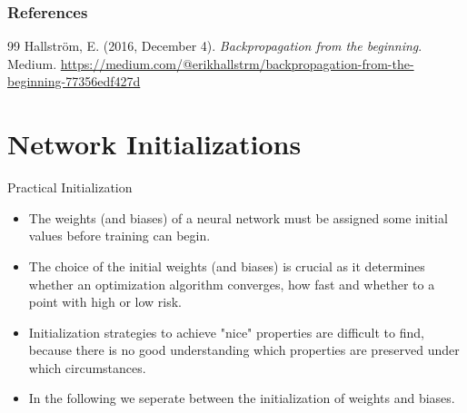 \begin{vbframe}
\frametitle{References}
\footnotesize{
\begin{thebibliography}{99}
Hallström, E. (2016, December 4). \textit{Backpropagation from the beginning}. Medium. \url{https://medium.com/@erikhallstrm/backpropagation-from-the-beginning-77356edf427d} 
\end{thebibliography}
}
\end{vbframe}



\section{Network Initializations}

\begin{vbframe} {Practical Initialization}
  \begin{itemize}
    \item The weights (and biases) of a neural network must be assigned some initial values before training can begin.
    \item The choice of the initial weights (and biases) is crucial as it determines whether an optimization algorithm converges, how fast and whether to a point with high or low risk. 
    \item Initialization strategies to achieve "nice" properties are difficult to find, because there is no good understanding which properties are preserved under which circumstances. 
    \item In the following we seperate between the initialization of weights and biases. 
  \end{itemize}
  \end{vbframe}
  
